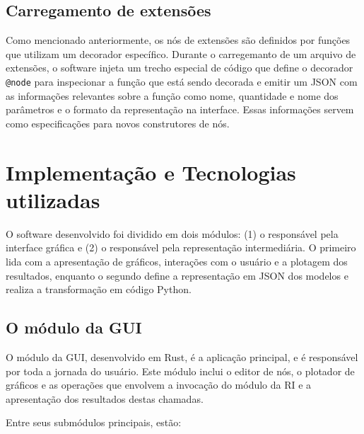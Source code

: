 \documentclass[
	12pt,				%
	openright,			%
	oneside,			%
	a4paper,			%
	main=brazil,
	english,			%
	]{ufsj-abntex2}
\begin{document}
\subsection{Carregamento de extensões}

Como mencionado anteriormente, os nós de extensões são definidos por funções que utilizam um decorador específico. Durante o carregemanto de um arquivo de extensões, o software injeta um trecho especial de código que define o decorador \texttt{@node} para inspecionar a função que está sendo decorada e emitir um JSON com as informações relevantes sobre a função como nome, quantidade e nome dos parâmetros e o formato da representação na interface. Essas informações servem como especificações para novos construtores de nós.

\section{Implementação e Tecnologias utilizadas}
\label{sec:tecnologias}

O software desenvolvido foi dividido em dois módulos: (1) o responsável pela interface gráfica e (2) o responsável pela representação intermediária. O primeiro lida com a apresentação de gráficos, interações com o usuário e a plotagem dos resultados, enquanto o segundo define a representação em JSON dos modelos e realiza a transformação em código Python.

\subsection{O módulo da GUI}
\label{sub:gui}

O módulo da GUI, desenvolvido em Rust, é a aplicação principal, e é responsável por toda a jornada do usuário. Este módulo inclui o editor de nós, o plotador de gráficos e as operações que envolvem a invocação do módulo da RI e a apresentação dos resultados destas chamadas.

Entre seus submódulos principais, estão:
\end{document}
